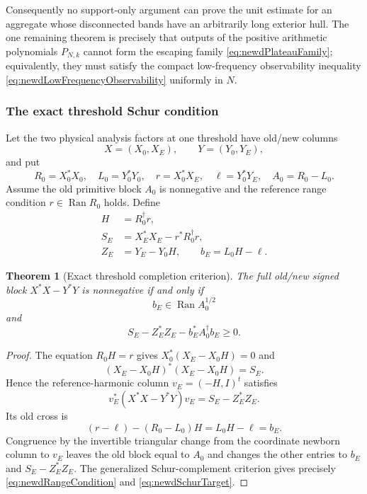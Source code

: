 \documentclass[11pt]{amsart}
\newtheorem{theorem}{Theorem}[section]
\theoremstyle{definition}
\theoremstyle{remark}
\begin{document}
Consequently no support-only argument can prove the unit estimate for an
aggregate whose disconnected bands have an arbitrarily long exterior
hull.  The one remaining theorem is precisely that
outputs of the positive arithmetic polynomials
$P_{N,k}$ cannot form the escaping family
\eqref{eq:newdPlateauFamily}; equivalently, they must satisfy the compact
low-frequency observability inequality
\eqref{eq:newdLowFrequencyObservability} uniformly in $N$.

\subsubsection{The exact threshold Schur condition}

Let the two physical analysis factors at one threshold have old/new columns
\[
 X=(X_0,X_E),\qquad Y=(Y_0,Y_E),
\]
and put
\begin{equation}\label{eq:newdPhysicalBlocks}
 R_0=X_0^*X_0,
 \quad L_0=Y_0^*Y_0,
 \quad r=X_0^*X_E,
 \quad \ell=Y_0^*Y_E,
 \quad A_0=R_0-L_0.
\end{equation}
Assume the old primitive block $A_0$ is nonnegative and the reference range
condition $r\in\operatorname{Ran}R_0$ holds.  Define
\begin{align}
 H&=R_0^\dagger r,
 \label{eq:newdReferenceLift}\\
 S_E&=X_E^*X_E-r^*R_0^\dagger r,
 \label{eq:newdReferenceSchur}\\
 Z_E&=Y_E-Y_0H,
 \qquad
 b_E=L_0H-\ell.
 \label{eq:newdOppositeResidual}
\end{align}

\begin{theorem}[Exact threshold completion criterion]
\label{thm:newdThresholdCriterion}
The full old/new signed block $X^*X-Y^*Y$ is nonnegative if and only if
\begin{equation}\label{eq:newdRangeCondition}
 b_E\in\operatorname{Ran}A_0^{1/2}
\end{equation}
and
\begin{equation}\label{eq:newdSchurTarget}
 S_E-Z_E^*Z_E-b_E^*A_0^\dagger b_E\geq0.
\end{equation}
\end{theorem}

\begin{proof}
The equation $R_0H=r$ gives
$X_0^*(X_E-X_0H)=0$ and
\[
 (X_E-X_0H)^*(X_E-X_0H)=S_E.
\]
Hence the reference-harmonic column $v_E=(-H,I)^t$ satisfies
\[
 v_E^*(X^*X-Y^*Y)v_E=S_E-Z_E^*Z_E.
\]
Its old cross is
\[
 (r-\ell)-(R_0-L_0)H=L_0H-\ell=b_E.
\]
Congruence by the invertible triangular change from the coordinate newborn
column to $v_E$ leaves the old block equal to $A_0$ and changes the other
entries to $b_E$ and $S_E-Z_E^*Z_E$.  The generalized Schur-complement
criterion gives precisely \eqref{eq:newdRangeCondition} and
\eqref{eq:newdSchurTarget}.
\end{proof}
\end{document}
